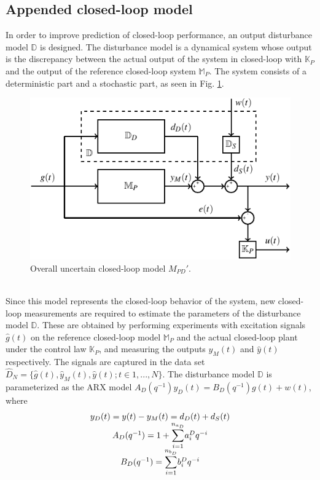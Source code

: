 \documentclass[letterpaper, 10 pt, conference]{ieeeconf}  %
\begin{document}
	\subsection{Appended closed-loop model}
	In order to improve prediction of closed-loop performance, an output disturbance model $\mathbb{D}$ is designed. The disturbance model is a dynamical system whose output is the discrepancy between the actual output of the system in closed-loop with  $\mathbb{K}_P$ and the output of the reference closed-loop system $\mathbb{M}_P$. The system consists of a deterministic part and a stochastic part, as seen in Fig. \ref{Appended}.
	\begin{figure}[h!]
		\hspace{20pt}
		\includegraphics[scale = 0.7]{Mp-D-E.pdf}
		\caption{Overall uncertain closed-loop model $M_{PD}'$.}
		\label{Appended}
	\end{figure}
	\vspace{-5pt} \\
	Since this model represents the closed-loop behavior of the system, new closed-loop measurements are required to estimate the parameters of the disturbance model $\mathbb{D}$. These are obtained by performing experiments with excitation signals $\hat{g}(t)$ on the reference closed-loop model $\mathbb{M}_P$ and the actual closed-loop plant under the control law $\mathbb{K}_P$, and measuring the outputs $\hat{y}_M(t)$ and $\hat{y}(t)$ respectively. The signals are captured in the data set $\hat{D}_{N}=\{\hat{g}(t),\hat{y}_M(t),\hat{y}(t);t\in{1,...,N}\}$.
	The disturbance model $\mathbb{D}$ is parameterized as the ARX model $A_D(q^{-1})y_D(t) = B_D(q^{-1})g(t)+w(t)$, where 
	\begin{equation*}
	\begin{matrix}
	y_D(t) = y(t) - y_M(t) = d_D(t)+d_S(t) \\ 
	A_D(q^{-1}) = 1+\mathlarger{\sum\limits_{i=1}^{n_{a_D}}}a_i^Dq^{-i}\\
	B_D(q^{-1}) = \mathlarger{\sum\limits_{i=1}^{n_{b_D}}}b_i^Dq^{-i}
	\end{matrix}  
	\end{equation*}
\end{document}
